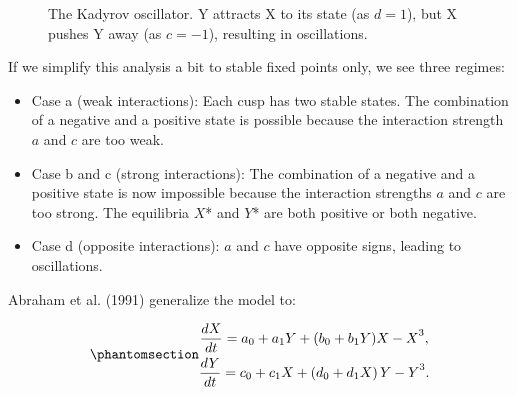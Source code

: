 \documentclass[
  a4paper,
  DIV=11,
  numbers=noendperiod,
  oneside]{scrreprt}
\begin{document}
\begin{figure}


\caption{\label{fig-ch4n-img17-old-65}The Kadyrov oscillator. Y attracts
X to its state (as \(d = 1\)), but X pushes Y away (as \(c = - 1\)),
resulting in oscillations.}

\end{figure}%

If we simplify this analysis a bit to stable fixed points only, we see
three regimes:

\begin{itemize}
\item
  Case a (weak interactions): Each cusp has two stable states. The
  combination of a negative and a positive state is possible because the
  interaction strength \(a\) and \(c\) are too weak.
\item
  Case b and c (strong interactions): The combination of a negative and
  a positive state is now impossible because the interaction strengths
  \(a\) and \(c\) are too strong. The equilibria \(X\)* and \(Y\)* are
  both positive or both negative.
\item
  Case d (opposite interactions): \(a\) and \(c\) have opposite signs,
  leading to oscillations.
\end{itemize}

Abraham et al. (1991) generalize the model to:

\begin{equation}\phantomsection\label{eq-ch4n-18-old-39}{
\begin{gathered}
\frac{dX}{dt} = {a_{0} + a_{1}Y + (b_{0} + b_{1}Y)X - X}^{3}, \\
\frac{dY}{dt} = {c_{0} + c_{1}X + \left( d_{0} + d_{1}X \right)Y - Y}^{3}. 
\end{gathered}
}\end{equation}
\end{document}
